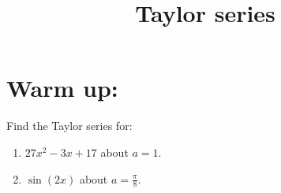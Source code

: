 \documentclass[]{ximera}
\title{Taylor series}
\begin{document}
\begin{abstract}		\end{abstract}
\maketitle



\section{Warm up:}
Find the Taylor series for:  
	\begin{enumerate}
	\item  $27x^2 - 3x + 17$ about $a=1$.  
	\item  $\sin(2x)$ about $a = \frac{\pi}{8}$.  
	\end{enumerate}
	
\end{document}
